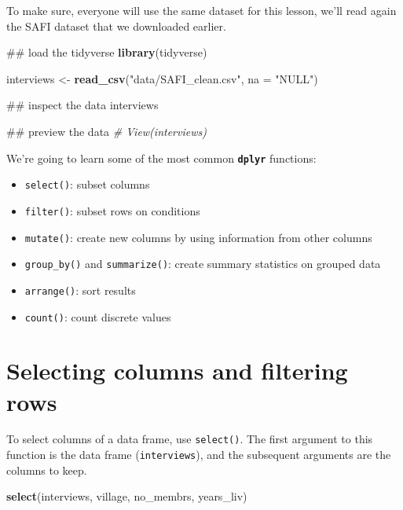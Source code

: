 \documentclass[]{book}
\newenvironment{Shaded}{\begin{snugshade}}{\end{snugshade}}
\newcommand{\KeywordTok}[1]{\textcolor[rgb]{0.13,0.29,0.53}{\textbf{#1}}}
\newcommand{\DataTypeTok}[1]{\textcolor[rgb]{0.13,0.29,0.53}{#1}}
\newcommand{\StringTok}[1]{\textcolor[rgb]{0.31,0.60,0.02}{#1}}
\newcommand{\CommentTok}[1]{\textcolor[rgb]{0.56,0.35,0.01}{\textit{#1}}}
\newcommand{\NormalTok}[1]{#1}
\providecommand{\tightlist}{%
  \setlength{\itemsep}{0pt}\setlength{\parskip}{0pt}}
\begin{document}
To make sure, everyone will use the same dataset for this lesson, we'll
read again the SAFI dataset that we downloaded earlier.

\begin{Shaded}
\begin{Highlighting}[]
\NormalTok{## load the tidyverse}
\KeywordTok{library}\NormalTok{(tidyverse)}

\NormalTok{interviews <-}\StringTok{ }\KeywordTok{read_csv}\NormalTok{(}\StringTok{"data/SAFI_clean.csv"}\NormalTok{, }\DataTypeTok{na =} \StringTok{"NULL"}\NormalTok{)}

\NormalTok{## inspect the data}
\NormalTok{interviews}

\NormalTok{## preview the data}
\CommentTok{# View(interviews)}
\end{Highlighting}
\end{Shaded}

We're going to learn some of the most common \textbf{\texttt{dplyr}}
functions:

\begin{itemize}
\tightlist
\item
  \texttt{select()}: subset columns
\item
  \texttt{filter()}: subset rows on conditions
\item
  \texttt{mutate()}: create new columns by using information from other
  columns
\item
  \texttt{group\_by()} and \texttt{summarize()}: create summary
  statistics on grouped data
\item
  \texttt{arrange()}: sort results
\item
  \texttt{count()}: count discrete values
\end{itemize}

\section{Selecting columns and filtering
rows}\label{selecting-columns-and-filtering-rows}

To select columns of a data frame, use \texttt{select()}. The first
argument to this function is the data frame (\texttt{interviews}), and
the subsequent arguments are the columns to keep.

\begin{Shaded}
\begin{Highlighting}[]
\KeywordTok{select}\NormalTok{(interviews, village, no_membrs, years_liv)}
\end{Highlighting}
\end{Shaded}
\end{document}
